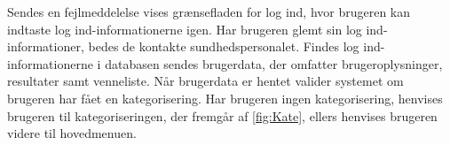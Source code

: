 Sendes en fejlmeddelelse vises grænsefladen for log ind, hvor brugeren kan indtaste log ind-informationerne igen. Har brugeren glemt sin log ind-informationer, bedes de kontakte sundhedspersonalet. Findes log ind-informationerne i databasen sendes brugerdata, der omfatter brugeroplysninger, resultater samt venneliste. Når brugerdata er hentet valider systemet om brugeren har fået en kategorisering. Har brugeren ingen kategorisering, henvises brugeren til kategoriseringen, der fremgår af \autoref{fig:Kate}, ellers henvises brugeren videre til hovedmenuen.


   


